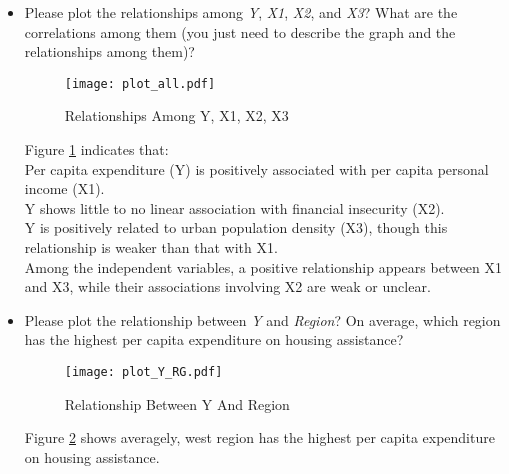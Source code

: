 \documentclass[12pt,letterpaper]{article}
\begin{document}
	\begin{itemize}
		
		\item
		Please plot the relationships among \emph{Y}, \emph{X1}, \emph{X2}, and \emph{X3}? What are the correlations among them (you just need to describe the graph and the relationships among them)?
		
		\vspace{.5cm}
		
		
	\begin{figure}[H]
		\centering
		\texttt{[image: plot\_all.pdf]}
		\caption{\footnotesize Relationships Among Y, X1, X2, X3}
		\label{fig:plot_1}
	\end{figure}
	
	Figure \ref{fig:plot_1} indicates that:\\
	Per capita expenditure (Y) is positively associated with per capita personal income (X1).\\
	Y shows little to no linear association with financial insecurity (X2).\\
	Y is positively related to urban population density (X3), though this relationship is weaker than that with X1.\\
	Among the independent variables, a positive relationship appears between X1 and X3, while their associations involving X2 are weak or unclear.
	
	\newpage
		
		\item
		Please plot the relationship between \emph{Y} and \emph{Region}? On average, which region has the highest per capita expenditure on housing assistance?
		
		\vspace{.5cm}
		
		\vspace{.2cm}
	  \begin{figure}[H]
		\centering
		\texttt{[image: plot\_Y\_RG.pdf]}
		\caption{\footnotesize Relationship Between Y And Region}
		\label{fig:plot_2}
	  \end{figure}
	  \vspace{.2cm}
	  Figure \ref{fig:plot_2} shows averagely, west region has the highest per capita expenditure on housing assistance.
		
   	  \vspace{1cm} 
		

\end{itemize}
\end{document}
